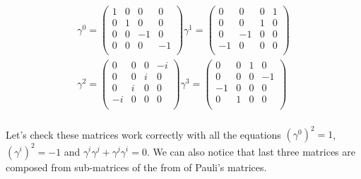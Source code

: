 \begin{equation*}
    \begin{gathered}
        \gamma^{0} = 
         \begin{pmatrix}
          1 & 0 & 0 & 0 \\
          0 & 1 & 0 & 0 \\
          0 & 0 & -1 & 0 \\
          0 & 0 & 0 & -1 \\
         \end{pmatrix}
        \gamma^{1} = 
         \begin{pmatrix}
          0 & 0 & 0 & 1 \\
          0 & 0 & 1 & 0 \\
          0 & -1 & 0 & 0 \\
          -1 & 0 & 0 & 0 \\
         \end{pmatrix} \\
        \gamma^{2} = 
         \begin{pmatrix}
          0 & 0 & 0 & -i \\
          0 & 0 & i & 0 \\
          0 & i & 0 & 0 \\
          -i & 0 & 0 & 0 \\
         \end{pmatrix}
        \gamma^{3} = 
         \begin{pmatrix}
          0 & 0 & 1 & 0 \\
          0 & 0 & 0 & -1 \\
          -1 & 0 & 0 & 0 \\
          0 & 1 & 0 & 0 \\
         \end{pmatrix} \\
    \end{gathered}
\end{equation*}

Let's check these matrices work correctly with all the equations $(\gamma^{0})^{2} = 1$, $(\gamma^{i})^{2} = -1$ and $\gamma^{i} \gamma^{j} + \gamma^{j} \gamma^{i} = 0$.
We can also notice that last three matrices are composed from sub-matrices of the from of Pauli's matrices.


